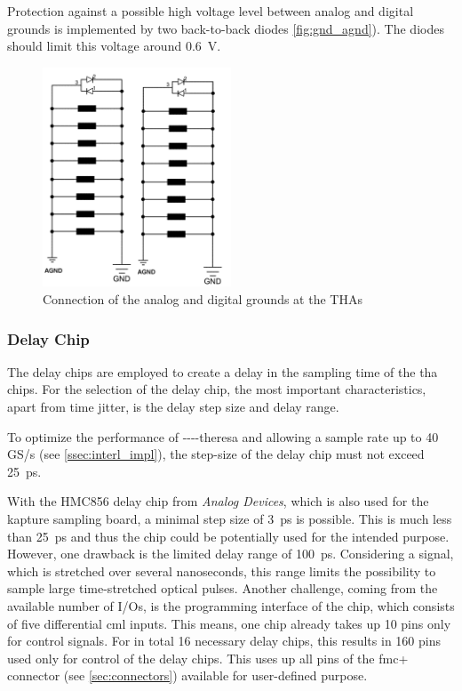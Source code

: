 Protection against a possible high voltage level between analog and digital grounds is implemented by two back-to-back diodes \autoref{fig:gnd_agnd}).
The diodes should limit this voltage around \SI{0.6}{\volt}.

\begin{figure}[tbh]
	\centering
	\includegraphics[width = 0.5\textwidth]{chap/04-theresa/img/schematic/gnd_agnd}
	\caption{Connection of the analog and digital grounds at the THAs}
	\label{fig:gnd_agnd}
\end{figure}

\subsubsection*{Delay Chip}
The delay chips are employed to create a delay in the sampling time of the \gls{tha} chips. For the selection of the delay chip, the most important characteristics, apart from time jitter, is the delay step size and delay range. 

To optimize the performance of \gls{----theresa} and allowing a sample rate up to 40 GS/s (see \autoref{ssec:interl_impl}), the step-size of the delay chip must not exceed \SI{25}{\pico \second}.

With the HMC856 delay chip from \textit{Analog Devices}, which is also used for the \gls{kapture} sampling board, a minimal step size of \SI{3}{\pico\second} \cite{hmc856} is possible.
This is much less than  \SI{25}{\pico \second} and thus the chip could be potentially used for the intended purpose.
However, one drawback is the limited delay range of \SI{100}{\pico\second}.
Considering a signal, which is stretched over several nanoseconds, this range limits the possibility to sample large time-stretched optical pulses.
Another challenge, coming from the available number of I/Os, is the programming interface of the chip, which consists of five differential \gls{cml} inputs.
This means, one chip already takes up 10 pins only for control signals.
For in total 16 necessary delay chips, this results in 160 pins used only for control of the delay chips.
This uses up all pins of the \gls{fmc}+ connector (see \autoref{sec:connectors}) available for user-defined purpose. 

